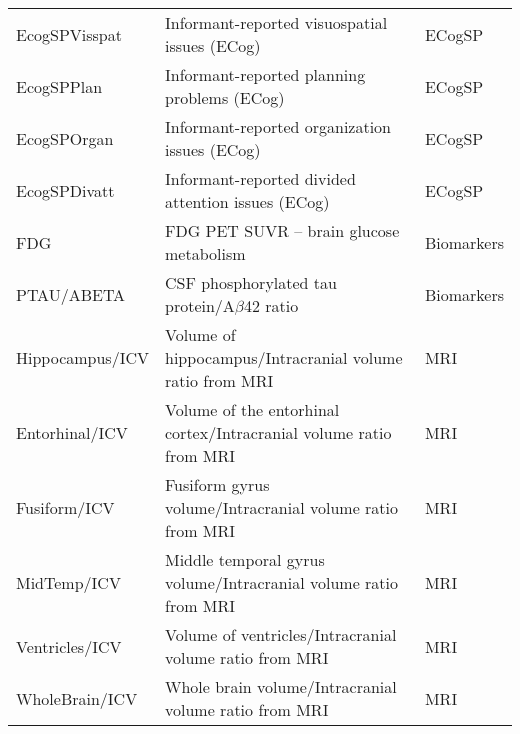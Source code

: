 \begin{table}[H]
\begin{adjustbox}{max width=\textwidth}
\begin{tabularx}{\textwidth}{>{\raggedright\arraybackslash}p{3cm} >{\raggedright\arraybackslash}X >{\raggedright\arraybackslash}p{3cm}}
			EcogSPVisspat         & Informant-reported visuospatial issues (ECog)                                      & ECogSP                \\
			EcogSPPlan            & Informant-reported planning problems (ECog)                                        & ECogSP                \\
			EcogSPOrgan           & Informant-reported organization issues (ECog)                                      & ECogSP                \\
			EcogSPDivatt          & Informant-reported divided attention issues (ECog)                                 & ECogSP                \\
			FDG                   & FDG PET SUVR – brain glucose metabolism                                            & Biomarkers            \\
			PTAU/ABETA            & CSF phosphorylated tau protein/A$\beta$42 ratio                                     & Biomarkers            \\
			Hippocampus/ICV       & Volume of hippocampus/Intracranial volume ratio from MRI                           & MRI                   \\
			Entorhinal/ICV        & Volume of the entorhinal cortex/Intracranial volume ratio from MRI                 & MRI                   \\
			Fusiform/ICV          & Fusiform gyrus volume/Intracranial volume ratio from MRI                           & MRI                   \\
			MidTemp/ICV           & Middle temporal gyrus volume/Intracranial volume ratio from MRI                    & MRI                   \\
			Ventricles/ICV        & Volume of ventricles/Intracranial volume ratio from MRI                            & MRI                   \\
			WholeBrain/ICV        & Whole brain volume/Intracranial volume ratio from MRI                              & MRI                   \\
			\bottomrule
		\end{tabularx}
	\end{adjustbox}
\end{table}

\newpage
